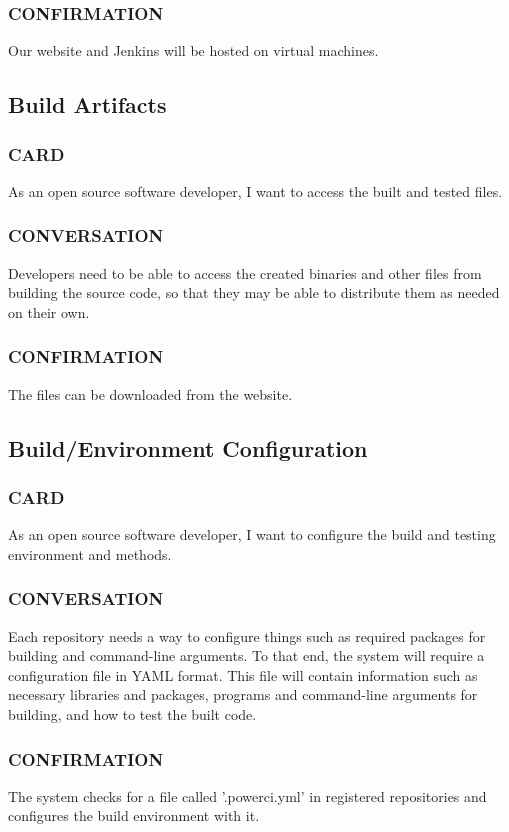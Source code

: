 \documentclass[10pt,letterpaper,onecolumn,journal]{IEEEtran}
\begin{document}
\subsubsection{CONFIRMATION}
Our website and Jenkins will be hosted on virtual machines.

\subsection{Build Artifacts}
\subsubsection{CARD}
As an open source software developer, I want to access the built and tested files.
\subsubsection{CONVERSATION}
Developers need to be able to access the created binaries and other files from building the source code, so that they may
be able to distribute them as needed on their own.
\subsubsection{CONFIRMATION}
The files can be downloaded from the website.

\subsection{Build/Environment Configuration}
\subsubsection{CARD}
As an open source software developer, I want to configure the build and testing environment and methods.
\subsubsection{CONVERSATION}
Each repository needs a way to configure things such as required packages for building and command-line arguments.
To that end, the system will require a configuration file in YAML format. This file will contain information such as necessary
libraries and packages, programs and command-line arguments for building, and how to test the built code.
\subsubsection{CONFIRMATION}
The system checks for a file called '.powerci.yml' in registered repositories and configures the build environment with it.
\end{document}
